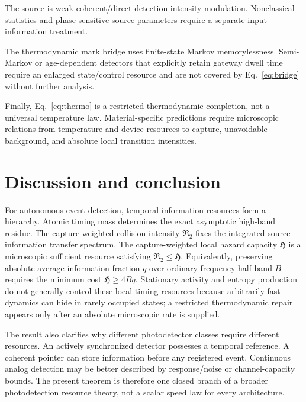 \documentclass[aps,prapplied,preprint,nofootinbib]{revtex4-2}
\newcommand{\Rtwo}{\mathfrak R_2}
\newcommand{\Hcap}{\mathfrak H}
\begin{document}
The source is weak coherent/direct-detection intensity modulation. Nonclassical statistics and phase-sensitive source parameters require a separate input-information treatment.

The thermodynamic mark bridge uses finite-state Markov memorylessness. Semi-Markov or age-dependent detectors that explicitly retain gateway dwell time require an enlarged state/control resource and are not covered by Eq.~\eqref{eq:bridge} without further analysis.

Finally, Eq.~\eqref{eq:thermo} is a restricted thermodynamic completion, not a universal temperature law. Material-specific predictions require microscopic relations from temperature and device resources to capture, unavoidable background, and absolute local transition intensities.

\section{Discussion and conclusion}

For autonomous event detection, temporal information resources form a hierarchy. Atomic timing mass determines the exact asymptotic high-band residue. The capture-weighted collision intensity $\Rtwo$ fixes the integrated source-information transfer spectrum. The capture-weighted local hazard capacity $\Hcap$ is a microscopic sufficient resource satisfying $\Rtwo\le\Hcap$. Equivalently, preserving absolute average information fraction $q$ over ordinary-frequency half-band $B$ requires the minimum cost $\Hcap\ge4Bq$. Stationary activity and entropy production do not generally control these local timing resources because arbitrarily fast dynamics can hide in rarely occupied states; a restricted thermodynamic repair appears only after an absolute microscopic rate is supplied.

The result also clarifies why different photodetector classes require different resources. An actively synchronized detector possesses a temporal reference. A coherent pointer can store information before any registered event. Continuous analog detection may be better described by response/noise or channel-capacity bounds. The present theorem is therefore one closed branch of a broader photodetection resource theory, not a scalar speed law for every architecture.

\appendix



\end{document}
